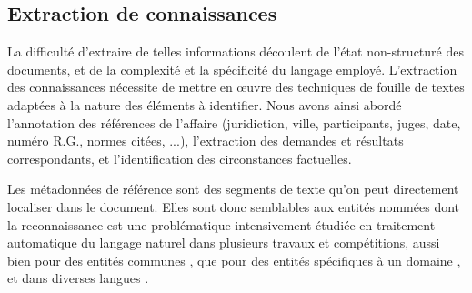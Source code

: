 
\subsection{Extraction de connaissances}
\label{subsec:intro:ie}
La difficulté d'extraire de telles informations découlent de l'état non-structuré des documents, et de la complexité et la spécificité du langage employé. L'extraction des connaissances nécessite de mettre en \oe uvre des techniques de fouille de textes adaptées à la nature des éléments à identifier. Nous avons ainsi abordé l'annotation des références de l'affaire (juridiction, ville, participants, juges, date, numéro R.G., normes citées, ...), l'extraction des demandes et résultats correspondants, et l'identification des circonstances factuelles.

Les métadonnées de référence sont des segments de texte qu'on peut directement localiser dans le document. Elles sont donc semblables aux entités nommées dont la reconnaissance est une problématique intensivement étudiée en traitement automatique du langage naturel \citep{yadav2018surveyNeuralNER} dans plusieurs travaux et compétitions, aussi bien pour des entités communes \citep{tjong2003introCoNLL,grishman1996muc6}, que pour des entités spécifiques à un domaine \citep{kim2004bioNer, persson2012nbbioner,hanisch2005prominer}, et dans diverses langues \citep{li2018wcpbioner,alfred2014malayner,amarappa2015kannada}. 

